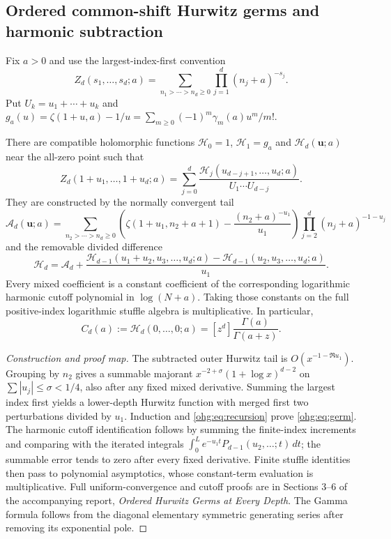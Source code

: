 \providecommand{\OHGH}{\mathcal H}
\providecommand{\OHGA}{\mathcal A}
\providecommand{\OHGL}{\mathcal L}
\providecommand{\OHGe}{\varepsilon}
\subsection{Ordered common-shift Hurwitz germs and harmonic subtraction}
\label{ohg:sec:germs}
Fix $a>0$ and use the largest-index-first convention
\[
 Z_d(s_1,\ldots,s_d;a)=
 \sum_{n_1>\cdots>n_d\ge0}\prod_{j=1}^d(n_j+a)^{-s_j}.
\]
Put $U_k=u_1+\cdots+u_k$ and
$g_a(u)=\zeta(1+u,a)-1/u
 =\sum_{m\ge0}(-1)^m\gamma_m(a)u^m/m!$.

\begin{theorem}
\label{ohg:thm:germ}
There are compatible holomorphic functions $\OHGH_0=1$, $\OHGH_1=g_a$
and $\OHGH_d(\bm u;a)$ near the all-zero point such that
\begin{equation}\label{ohg:eq:germ}
 Z_d(1+u_1,\ldots,1+u_d;a)=
 \sum_{j=0}^d\frac{\OHGH_j(u_{d-j+1},\ldots,u_d;a)}{U_1\cdots U_{d-j}}.
\end{equation}
They are constructed by the normally convergent tail
\[
 \OHGA_d(\bm u;a)=\sum_{n_2>\cdots>n_d\ge0}
 \left(\zeta(1+u_1,n_2+a+1)-\frac{(n_2+a)^{-u_1}}{u_1}\right)
 \prod_{j=2}^d(n_j+a)^{-1-u_j}
\]
and the removable divided difference
\begin{equation}\label{ohg:eq:recursion}
 \OHGH_d=\OHGA_d+
 \frac{\OHGH_{d-1}(u_1+u_2,u_3,\ldots,u_d;a)
       -\OHGH_{d-1}(u_2,u_3,\ldots,u_d;a)}{u_1}.
\end{equation}
Every mixed coefficient is a constant coefficient of the corresponding
logarithmic harmonic cutoff polynomial in $\log(N+a)$. Taking those
constants on the full positive-index logarithmic stuffle algebra is
multiplicative. In particular,
\[
 C_d(a):=\OHGH_d(0,\ldots,0;a)=[z^d]\frac{\Gamma(a)}{\Gamma(a+z)}.
\]
\end{theorem}
\begin{proof}[Construction and proof map]
The subtracted outer Hurwitz tail is $O(x^{-1-\Re u_1})$. Grouping by
$n_2$ gives a summable majorant $x^{-2+\sigma}(1+\log x)^{d-2}$ on
$\sum|u_j|\le\sigma<1/4$, also after any fixed mixed derivative.
Summing the largest index first yields a lower-depth Hurwitz function
with merged first two perturbations divided by $u_1$. Induction and
\eqref{ohg:eq:recursion} prove \eqref{ohg:eq:germ}.
The harmonic cutoff identification follows by summing the finite-index
increments and comparing with the iterated integrals
$\int_0^L e^{-u_1t}P_{d-1}(u_2,\ldots;t)\,dt$; the summable error tends
to zero after every fixed derivative. Finite stuffle identities then
pass to polynomial asymptotics, whose constant-term evaluation is
multiplicative. Full uniform-convergence and cutoff proofs are in
Sections 3--6 of the accompanying report, \emph{Ordered Hurwitz Germs
at Every Depth}. The Gamma formula follows from the diagonal elementary
symmetric generating series after removing its exponential pole.
\end{proof}

